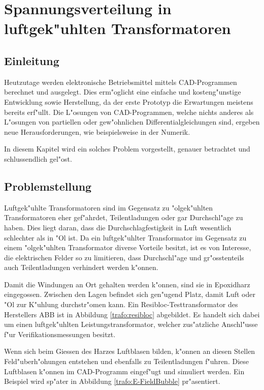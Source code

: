 \chapter{Spannungsverteilung in luftgek"uhlten Transformatoren\label{chapter:thema}}
\begin{refsection}

\section{Einleitung}

Heutzutage werden elektronische Betriebsmittel mittels CAD-Programmen berechnet und ausgelegt. Dies erm"oglicht eine einfache und kosteng"unstige Entwicklung sowie Herstellung, da der erste Prototyp die Erwartungen meistens bereits erf"ullt. Die L"osungen von CAD-Programmen, welche nichts anderes als L"osungen von partiellen oder gew"ohnlichen Differentialgleichungen sind, ergeben neue Herausforderungen, wie beispielsweise in der Numerik. 

In diesem Kapitel wird ein solches Problem vorgestellt, genauer betrachtet und schlussendlich gel"ost.

\section{Problemstellung}

Luftgek"uhlte Transformatoren sind im Gegensatz zu "olgek"uhlten Transformatoren eher gef"ahrdet, Teilentladungen oder gar Durchschl"age zu haben. Dies liegt daran, dass die Durchschlagfestigkeit in Luft wesentlich schlechter als in "Ol ist. Da ein luftgek"uhlter Transformator im Gegensatz zu einem "olgek"uhlten Transformator diverse Vorteile besitzt, ist es von Interesse, die elektrischen Felder so zu limitieren, dass Durchschl"age und gr"osstenteils auch Teilentladungen verhindert werden k"onnen. 

Damit die Windungen an Ort gehalten werden k"onnen, sind sie in Epoxidharz eingegossen. Zwischen den Lagen befindet sich gen"ugend Platz, damit Luft oder "Ol zur K"uhlung durchstr"omen kann. Ein Resibloc-Testtransformator des Herstellers ABB ist in Abbildung \ref{trafo:resibloc} abgebildet. Es handelt sich dabei um einen luftgek"uhlten Leistungstransformator, welcher zus"atzliche Anschl"usse f"ur Verifikationsmessungen besitzt. 

Wenn sich beim Giessen des Harzes Luftblasen bilden, k"onnen an diesen Stellen Feld"uberh"ohungen entstehen und ebenfalls zu Teilentladungen f"uhren. Diese Luftblasen k"onnen im CAD-Programm eingef"ugt und simuliert werden. Ein Beispiel wird sp"ater in Abbildung \ref{trafo:E-FieldBubble} pr"asentiert.


\end{refsection}
